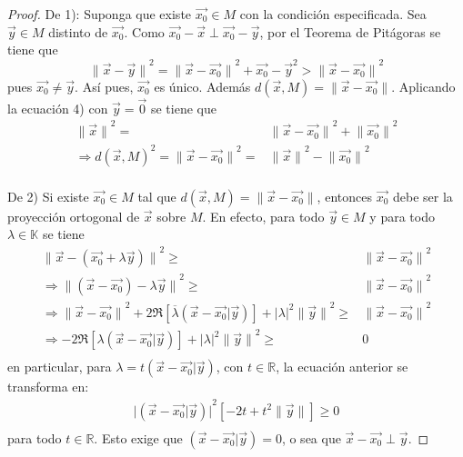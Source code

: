 \documentclass[12pt]{report}
\theoremstyle{largebreak}
\newcommand\abs[1]{\ensuremath{\big|#1\big|}}
\newcommand\norm[1]{\ensuremath{\|#1\|}}
\newcommand\pint[2]{\ensuremath{\left(#1\big| #2\right)}}
\newcommand\conj[1]{\ensuremath{\overline{#1}}}
\begin{document}
    \begin{proof}
        De 1): Suponga que existe $\vec{x_0}\in M$ con la condición especificada. Sea $\vec{y}\in M$ distinto de $\vec{x_0}$. Como $\vec{x_0}-\vec{x}\perp\vec{x_0}-\vec{y}$, por el Teorema de Pitágoras se tiene que
        \begin{equation}
            \norm{\vec{x}-\vec{y}}^2=\norm{\vec{x}-\vec{x_0}}^2+\vec{x_0}-\vec{y}^2>\norm{\vec{x}-\vec{x_0}}^2
        \end{equation}
        pues $\vec{x_0}\neq \vec{y}$. Así pues, $\vec{x_0}$ es único. Además $d(\vec{x},M)=\norm{\vec{x}-\vec{x_0}}$. Aplicando la ecuación 4) con $\vec{y}=\vec{0}$ se tiene que
        \begin{equation*}
            \begin{split}
                \norm{\vec{x}}^2=&\norm{\vec{x}-\vec{x_0}}^2+\norm{\vec{x_0}}^2\\
                \Rightarrow d(\vec{x},M)^2=\norm{\vec{x}-\vec{x_0}}^2=&\norm{\vec{x}}^2-\norm{\vec{x_0}}^2\\
            \end{split}
        \end{equation*}
        
        De 2) Si existe $\vec{x_0}\in M$ tal que $d(\vec{x},M)=\norm{\vec{x}-\vec{x_0}}$, entonces $\vec{x_0}$ debe ser la proyección ortogonal de $\vec{x}$ sobre $M$. En efecto, para todo $\vec{y}\in M$ y para todo $\lambda\in\mathbb{K}$ se tiene
        \begin{equation}
            \begin{split}
                \norm{\vec{x}-(\vec{x_0}+\lambda\vec{y})}^2\geq&\norm{\vec{x}-\vec{x_0}}^2\\
                \Rightarrow \norm{(\vec{x}-\vec{x_0})-\lambda\vec{y}}^2\geq&\norm{\vec{x}-\vec{x_0}}^2\\
                \Rightarrow \norm{\vec{x}-\vec{x_0}}^2+2\Re[\conj{\lambda} \pint{\vec{x}-\vec{x_0}}{\vec{y}}]+\abs{\lambda}^2\norm{\vec{y}}^2\geq&\norm{\vec{x}-\vec{x_0}}^2\\
                \Rightarrow -2\Re[\lambda\pint{\vec{x}-\vec{x_0}}{\vec{y}}]+\abs{\lambda}^2\norm{\vec{y}}^2\geq& 0\\
            \end{split}
        \end{equation}
        en particular, para $\lambda=t\pint{\vec{x}-\vec{x_0}}{\vec{y}}$, con $t\in\mathbb{R}$, la ecuación anterior se transforma en:
        \begin{equation*}
            \begin{split}
                \abs{\pint{\vec{x}-\vec{x_0}}{\vec{y}}}^2\left[-2t+t^2\norm{\vec{y}}\right]\geq0 \\
            \end{split}
        \end{equation*}
        para todo $t\in\mathbb{R}$. Esto exige que $\pint{\vec{x}-\vec{x_0}}{\vec{y}}=0$, o sea que $\vec{x}-\vec{x_0}\perp \vec{y}$.
    \end{proof}
\end{document}
